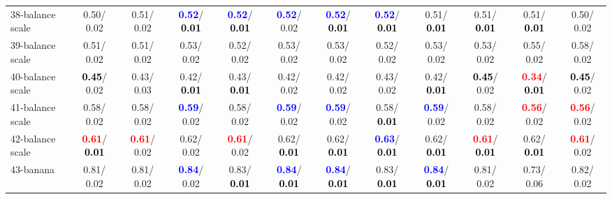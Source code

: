 \begin{table}[h]
\begin{center}
{\begin{tabular}{lc|c|c|c|c|c|c|c|c|c|c}
38-balance scale &   0.50/  0.02 &   0.51/  0.02 & \textcolor{blue}{\textbf{  0.52}}/\textcolor{black}{\textbf{  0.01}} & \textcolor{blue}{\textbf{  0.52}}/\textcolor{black}{\textbf{  0.01}} & \textcolor{blue}{\textbf{  0.52}}/  0.02 & \textcolor{blue}{\textbf{  0.52}}/\textcolor{black}{\textbf{  0.01}} & \textcolor{blue}{\textbf{  0.52}}/\textcolor{black}{\textbf{  0.01}} &   0.51/\textcolor{black}{\textbf{  0.01}} &   0.51/\textcolor{black}{\textbf{  0.01}} &   0.51/\textcolor{black}{\textbf{  0.01}} &   0.50/  0.02 \\
39-balance scale &   0.51/  0.02 &   0.51/  0.02 &   0.53/  0.02 &   0.52/  0.02 &   0.53/  0.02 &   0.53/  0.02 &   0.52/  0.02 &   0.53/  0.02 &   0.53/  0.02 &   0.55/  0.02 &   0.58/  0.02 \\ \hline
40-balance scale & \textcolor{black}{\textbf{  0.45}}/  0.02 &   0.43/  0.03 &   0.42/\textcolor{black}{\textbf{  0.01}} &   0.43/\textcolor{black}{\textbf{  0.01}} &   0.42/  0.02 &   0.42/  0.02 &   0.43/  0.02 &   0.42/\textcolor{black}{\textbf{  0.01}} & \textcolor{black}{\textbf{  0.45}}/  0.02 & \textcolor{red}{\textbf{  0.34}}/\textcolor{black}{\textbf{  0.01}} & \textcolor{black}{\textbf{  0.45}}/  0.02 \\
41-balance scale &   0.58/  0.02 &   0.58/  0.02 & \textcolor{blue}{\textbf{  0.59}}/  0.02 &   0.58/  0.02 & \textcolor{blue}{\textbf{  0.59}}/  0.02 & \textcolor{blue}{\textbf{  0.59}}/  0.02 &   0.58/\textcolor{black}{\textbf{  0.01}} & \textcolor{blue}{\textbf{  0.59}}/  0.02 &   0.58/  0.02 & \textcolor{red}{\textbf{  0.56}}/  0.02 & \textcolor{red}{\textbf{  0.56}}/  0.02 \\
42-balance scale & \textcolor{red}{\textbf{  0.61}}/\textcolor{black}{\textbf{  0.01}} & \textcolor{red}{\textbf{  0.61}}/  0.02 &   0.62/  0.02 & \textcolor{red}{\textbf{  0.61}}/  0.02 &   0.62/\textcolor{black}{\textbf{  0.01}} &   0.62/\textcolor{black}{\textbf{  0.01}} & \textcolor{blue}{\textbf{  0.63}}/\textcolor{black}{\textbf{  0.01}} &   0.62/\textcolor{black}{\textbf{  0.01}} & \textcolor{red}{\textbf{  0.61}}/\textcolor{black}{\textbf{  0.01}} &   0.62/\textcolor{black}{\textbf{  0.01}} & \textcolor{red}{\textbf{  0.61}}/  0.02 \\
43-banana &   0.81/  0.02 &   0.81/  0.02 & \textcolor{blue}{\textbf{  0.84}}/  0.02 &   0.83/\textcolor{black}{\textbf{  0.01}} & \textcolor{blue}{\textbf{  0.84}}/\textcolor{black}{\textbf{  0.01}} & \textcolor{blue}{\textbf{  0.84}}/\textcolor{black}{\textbf{  0.01}} &   0.83/\textcolor{black}{\textbf{  0.01}} & \textcolor{blue}{\textbf{  0.84}}/\textcolor{black}{\textbf{  0.01}} &   0.81/  0.02 &   0.73/  0.06 &   0.82/  0.02 \\

\end{tabular}}
\end{center}
\end{table}
